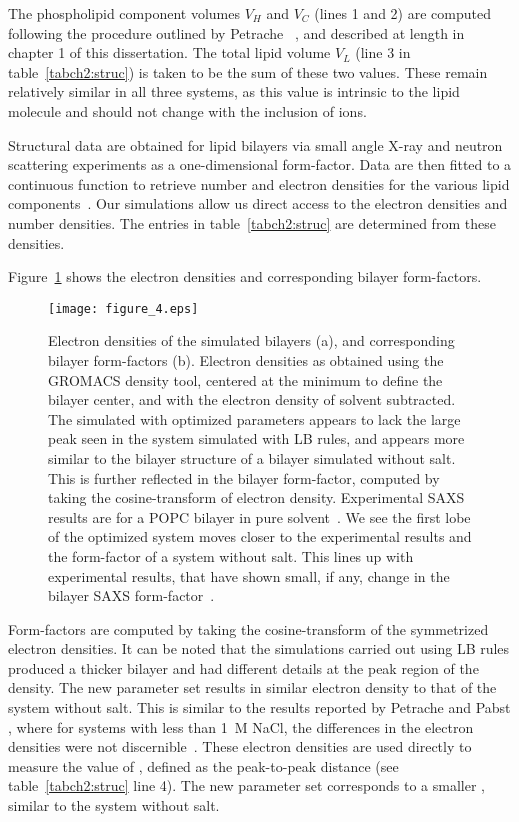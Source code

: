 The phospholipid component volumes $V_H$ and $V_C$ (lines 1 and 2) are
computed following the procedure outlined by Petrache \etal~\cite{petrache:1997}, and described at length in chapter 1 of this dissertation. 
The total lipid volume $V_L$ (line 3 in table~\ref{tabch2:struc}) 
is taken to be the sum of these two values. 
These remain relatively similar in all three systems, 
as this value is intrinsic to the lipid molecule 
and should not change with the inclusion of ions.

Structural data are obtained for lipid bilayers via small angle X-ray and neutron scattering
experiments as a one-dimensional form-factor. Data are then
fitted to a continuous function to retrieve number and electron
densities for the various lipid components~\cite{nagle:2000,fogarty:2015}. 
Our simulations allow us direct access to the electron densities and number densities. 
The entries in table~\ref{tabch2:struc} are determined from these densities.

Figure~\ref{figch2:eldens} shows the electron densities and corresponding bilayer form-factors.
\begin{figure}[H]
    \caption[Electron densities of the simulated bilayers]{Electron densities of the simulated bilayers (a), and corresponding bilayer form-factors (b).
        Electron densities as obtained using the GROMACS density tool,
    centered at the minimum to define the bilayer center, and with the electron density of solvent subtracted.
    The simulated with optimized parameters appears to lack the large peak seen in the system simulated
    with LB rules, and appears more similar to the
bilayer structure of a bilayer simulated without salt. 
This is further reflected in the bilayer form-factor, 
computed by taking the cosine-transform of electron density. Experimental
SAXS results are for a POPC bilayer in pure solvent~\cite{fogarty:2015}. We see the first lobe
of the optimized system moves closer to the experimental results and the form-factor of a system without salt. This lines up with experimental results, that have shown small, if any, change
in the bilayer SAXS form-factor~\cite{pabst:2007,petrache:2006:swelling,uhrikova:2008}.}
    \label{figch2:eldens}
    \texttt{[image: figure\_4.eps]}
\end{figure}
Form-factors are computed by taking the cosine-transform of the symmetrized electron densities.   
It can be noted that the simulations carried out using LB rules produced a
thicker bilayer and had different details at the peak region of the density. 
The new parameter set results in similar electron density to that of the system without salt.
This is similar to the results reported by Petrache
\etal{} and Pabst \etal{}, where for systems with less than 1~M NaCl, 
the differences in the electron densities were not
discernible~\cite{petrache:2006:swelling,pabst:2007}. 
These electron densities are used directly to measure the value of \dhh{}, 
defined as the peak-to-peak distance (see table~\ref{tabch2:struc} line 4). 
The new parameter set corresponds to a smaller \dhh{}, similar to the system without salt.

